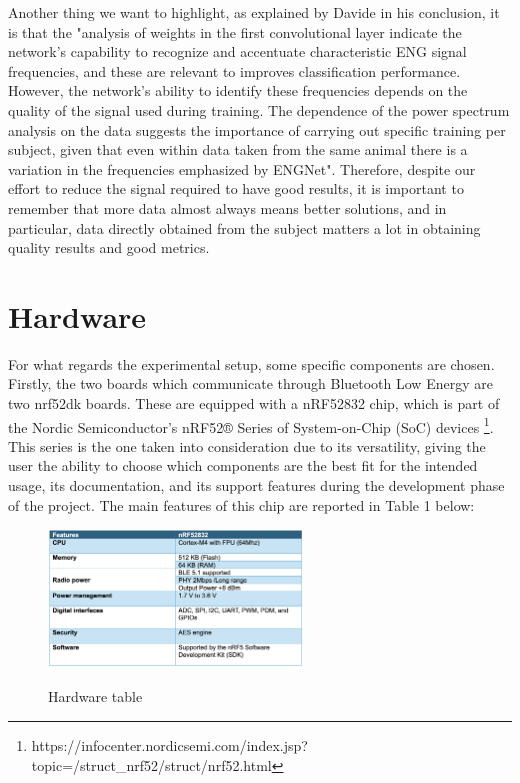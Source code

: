\documentclass{Configuration_Files/PoliMi3i_thesis}
\begin{document}
Another thing we want to highlight, as explained by Davide in his conclusion, it is that the "analysis of weights in the first convolutional layer indicate the network’s capability to recognize and accentuate characteristic ENG signal frequencies, and these are relevant to improves classification performance. However, the network’s ability to identify these frequencies depends on the quality of the signal used during training. The dependence of the power spectrum analysis on the data suggests the importance of carrying out specific training per subject, given that even within data taken from the same animal there is a variation in the frequencies emphasized by ENGNet".
Therefore, despite our effort to reduce the signal required to have good results, it is important to remember that more data almost always means better solutions, and in particular, data directly obtained from the subject matters a lot in obtaining quality results and good metrics.


\section*{Hardware}

For what regards the experimental setup, some specific components are chosen. Firstly, the two boards which communicate through Bluetooth Low Energy are two nrf52dk boards. These are equipped with a nRF52832 chip, which is part of the Nordic Semiconductor’s nRF52® Series of System-on-Chip (SoC) devices \footnote{https://infocenter.nordicsemi.com/index.jsp?topic=/struct\_nrf52/struct/nrf52.html}. This series is the one taken into consideration due to its versatility, giving the user the ability to choose which components are the best fit for the intended usage, its documentation, and its support features during the development phase of the project. The main features of this chip are reported in Table 1 below:

\begin{figure}[H]
    \centering
    \includegraphics[width=0.6\textwidth]{Materials/figure1}
    \label{materials_1}
    \caption{Hardware table}
\end{figure}
\end{document}
